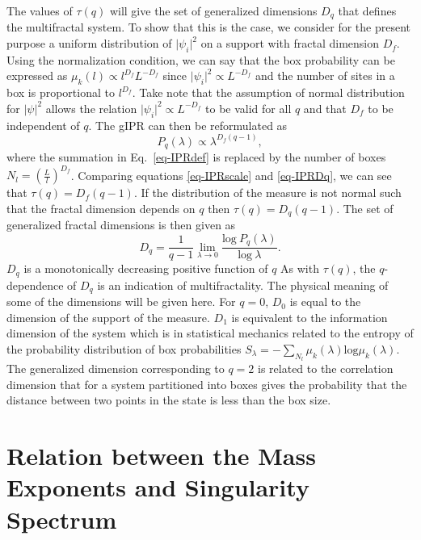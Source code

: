 The values of $\tau(q)$ will give the set of generalized dimensions $D_q$ that
defines the multifractal system.  To show that this is the case, we consider for
the present purpose a uniform distribution of $\vert\psi_i\vert^2$ on a support
with fractal dimension $D_f$.  Using the normalization condition, we can say
that the box probability can be expressed as $\mu_k(l)\propto l^{D_f}L^{-D_f}$
since $\vert\psi_i\vert^2\propto L^{-D_f}$ and the number of sites in a box is
proportional to $l^{D_f}$.
Take note that the assumption of normal distribution for $\vert\psi\vert^2$
allows the relation $\vert\psi_i\vert^2\propto L^{-D_f}$ to be valid for all $q$
and that $D_f$ to be independent of $q$.  The gIPR can then be reformulated as
%
\begin{equation}
	\label{eq-IPRDq}
 	P_q(\lambda)\propto\lambda^{D_f(q-1)},
\end{equation}
%
where the summation in Eq.~\eqref{eq-IPRdef} is replaced by the number of boxes
$N_l=(\frac{L}{l})^{D_f}$.
Comparing equations \eqref{eq-IPRscale} and \eqref{eq-IPRDq}, we can see that
$\tau(q)=D_f (q-1)$.  If the distribution of the measure is not normal such that
the fractal dimension depends on $q$ then $\tau(q)=D_q (q-1)$.  The set of
generalized fractal dimensions is then given as
%
\begin{equation}
 D_q=\frac{1}{q-1}\lim_{\lambda\rightarrow0}\frac{\mathrm{log}~P_q(\lambda)}{
\mathrm{log}~\lambda}. \end{equation}
%
$D_q$ is a monotonically decreasing positive function of $q$
As with $\tau(q)$, the $q$-dependence of $D_q$ is an indication of multifractality.
The physical meaning of some of the dimensions will be given here.  For $q=0$,
$D_0$ is equal to the dimension of the support of the measure.  $D_1$ is
equivalent to the information dimension of the system which is in statistical
mechanics related to the entropy of the probability distribution of box
probabilities $S_\lambda=-\sum_{N_l}\mu_k(\lambda)\mathrm{log}\mu_k(\lambda)$. 
The generalized dimension corresponding to $q=2$ is related to the correlation
dimension that for a system partitioned into boxes gives the probability that the distance between two points in the state is
less than the box size.


\section{Relation between the Mass Exponents and Singularity Spectrum}
\label{sec-tau&falph}

